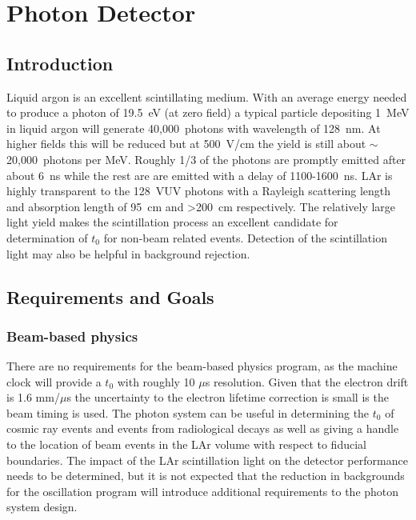 \chapter{Photon Detector}
\label{ch:photon}
\section{Introduction}



Liquid argon is an excellent scintillating medium. With an average
energy needed to produce a photon of 19.5~eV (at zero field) a typical
particle depositing 1~MeV in liquid argon will generate 40,000~photons
with wavelength of 128~nm. At higher fields this will be reduced but
at 500~V/cm the yield is still about $\sim$20,000~photons per
MeV. Roughly 1/3 of the photons are promptly emitted after about 6~ns
while the rest are are emitted with a delay of 1100-1600~ns. LAr
is highly transparent to the 128~VUV photons with a Rayleigh
scattering length and absorption length of 95~cm and >200~cm
respectively. The relatively large light yield makes the scintillation
process an excellent candidate for determination of $t_{0}$ for
non-beam related events. Detection of the scintillation light may also
be helpful in background rejection.

\section{Requirements and Goals}

\subsection{Beam-based physics}

There are no requirements for the beam-based physics program, as the
machine clock will provide a $t_{0}$ with roughly 10 $\mu$s
resolution. Given that the electron drift is 1.6 mm/$\mu$s the
uncertainty to the electron lifetime correction is small is  the beam
timing is used. The photon system can be useful in determining the
$t_{0}$ of cosmic ray events and events from radiological decays as
well as giving a handle to the location of beam events in the LAr
volume with respect to fiducial boundaries. The impact of the LAr
scintillation light on the detector performance needs to be
determined, but it is not expected that the reduction in backgrounds
for the oscillation program will introduce additional requirements to
the photon system design.

